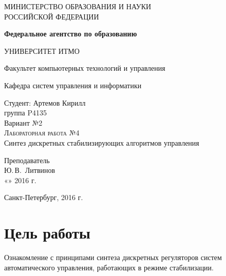\documentclass[a4paper,14pt]{extreport}
\begin{document}
	
	\begin{titlepage}
		\begin{center}
			\large
			МИНИСТЕРСТВО ОБРАЗОВАНИЯ И НАУКИ\\ РОССИЙСКОЙ ФЕДЕРАЦИИ
			
			\textbf{Федеральное агентство по образованию}
			\vspace{0.5cm}
			
			УНИВЕРСИТЕТ ИТМО
			\vspace{0.25cm}
			
			Факультет компьютерных технологий и управления
			
			Кафедра систем управления и информатики
			\vfill
			
			
			Студент: Артемов Кирилл\\
			группа P4135\\
			Вариант №2\\
			\textsc{Лабораторная работа №4}\\[5mm]
			
			{\LARGE Синтез дискретных стабилизирующих алгоритмов управления}
			\bigskip
			
		\end{center}
		\vfill
		
		\newlength{\ML}
		\hfill\begin{minipage}{0.4\textwidth}
			Преподаватель\\
			\underline{\hspace{\ML}} Ю.\,В.~Литвинов\\
			«\underline{\hspace{0.7cm}}» \underline{\hspace{2cm}} 2016 г.
		\end{minipage}%
		\bigskip
		
		\vfill
		
		\begin{center}
			Санкт-Петербург, 2016 г.
		\end{center}
	\end{titlepage}
	\newpage
	
	\section{Цель работы}
	
	Ознакомление с принципами синтеза дискретных регуляторов систем автоматического управления, работающих в режиме стабилизации.
	
\end{document}
